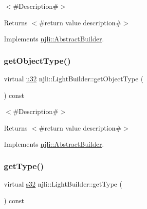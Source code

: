 $<$\#\+Description\#$>$

\begin{DoxyReturn}{Returns}
$<$\#return value description\#$>$ 
\end{DoxyReturn}


Implements \mbox{\hyperlink{classnjli_1_1_abstract_builder_a902f73ea78031b06aca183a417f3413b}{njli\+::\+Abstract\+Builder}}.

\mbox{\label{classnjli_1_1_light_builder_a77843a3f1458641e1010c8054f244fba}} 
\subsubsection{\texorpdfstring{get\+Object\+Type()}{getObjectType()}}
{\footnotesize\ttfamily virtual \mbox{\hyperlink{_util_8h_a10e94b422ef0c20dcdec20d31a1f5049}{u32}} njli\+::\+Light\+Builder\+::get\+Object\+Type (\begin{DoxyParamCaption}{ }\end{DoxyParamCaption}) const\hspace{0.3cm}{\ttfamily [virtual]}}

$<$\#\+Description\#$>$

\begin{DoxyReturn}{Returns}
$<$\#return value description\#$>$ 
\end{DoxyReturn}


Implements \mbox{\hyperlink{classnjli_1_1_abstract_builder_a0f2d344fcf697b167f4f2b1122b5fb33}{njli\+::\+Abstract\+Builder}}.

\mbox{\label{classnjli_1_1_light_builder_a5726f852a750eb9eab320deb78b1203b}} 
\subsubsection{\texorpdfstring{get\+Type()}{getType()}}
{\footnotesize\ttfamily virtual \mbox{\hyperlink{_util_8h_aa62c75d314a0d1f37f79c4b73b2292e2}{s32}} njli\+::\+Light\+Builder\+::get\+Type (\begin{DoxyParamCaption}{ }\end{DoxyParamCaption}) const\hspace{0.3cm}{\ttfamily [virtual]}}

